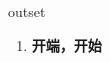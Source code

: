 
\begin{frame}
{\huge outset}
\begin{center}
\begin{enumerate}\Large
  \item \textbf{开端，开始}
\end{enumerate}
\end{center}
\end{frame}
